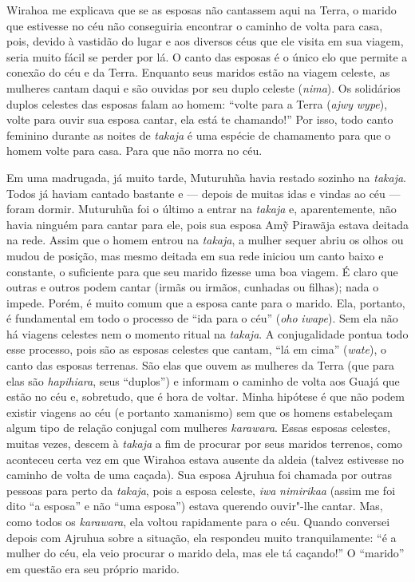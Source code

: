 Wirahoa me explicava que se as esposas não cantassem aqui na Terra, o
marido que estivesse no céu não conseguiria encontrar o caminho de volta
para casa, pois, devido à vastidão do lugar e aos diversos céus que ele
visita em sua viagem, seria muito fácil se perder por lá. O canto das
esposas é o único elo que permite a conexão do céu e da Terra. Enquanto
seus maridos estão na viagem celeste, as mulheres cantam daqui e são
ouvidas por seu duplo celeste (\emph{nima}). Os solidários duplos
celestes das esposas falam ao homem: ``volte para a Terra (\emph{ajwy}
\emph{wype}), volte para ouvir sua esposa cantar, ela está te chamando!''
Por isso, todo canto feminino durante as noites de \emph{takaja} é uma
espécie de chamamento para que o homem volte para casa. Para que não
morra no céu.

Em uma madrugada, já muito tarde, Muturuhũa havia restado sozinho na
\emph{takaja}. Todos já haviam cantado bastante e --- depois de muitas
idas e vindas ao céu --- foram dormir. Muturuhũa foi o último a entrar na
\emph{takaja} e, aparentemente, não havia ninguém para cantar para ele,
pois sua esposa Amỹ Pirawãja estava deitada na rede. Assim que o homem
entrou na \emph{takaja}, a mulher sequer abriu os olhos ou mudou de
posição, mas mesmo deitada em sua rede iniciou um canto baixo e
constante, o suficiente para que seu marido fizesse uma boa viagem. É
claro que outras e outros podem cantar (irmãs ou irmãos, cunhadas ou
filhas); nada o impede. Porém, é muito comum que a esposa cante para o
marido. Ela, portanto, é fundamental em todo o processo de ``ida para o
céu'' (\emph{oho} \emph{iwape}). Sem ela não há viagens celestes nem o
momento ritual na \emph{takaja}. A conjugalidade pontua todo esse
processo, pois são as esposas celestes que cantam, ``lá em cima''
(\emph{wate}), o canto das esposas terrenas. São elas que ouvem as
mulheres da Terra (que para elas são \emph{hapihiara}, seus ``duplos'') e
informam o caminho de volta aos Guajá que estão no céu e, sobretudo, que
é hora de voltar. Minha hipótese é que não podem existir viagens ao céu
(e portanto xamanismo) sem que os homens estabeleçam algum tipo de
relação conjugal com mulheres \emph{karawara}. Essas esposas celestes,
muitas vezes, descem à \emph{takaja} a fim de procurar por seus maridos
terrenos, como aconteceu certa vez em que Wirahoa estava ausente da
aldeia (talvez estivesse no caminho de volta de uma caçada). Sua esposa
Ajruhua foi chamada por outras pessoas para perto da \emph{takaja}, pois
a esposa celeste, \emph{iwa} \emph{nimirikaa} (assim me foi dito ``a
esposa'' e não ``uma esposa'') estava querendo ouvir"-lhe cantar. Mas, como
todos os \emph{karawara}, ela voltou rapidamente para o céu. Quando
conversei depois com Ajruhua sobre a situação, ela respondeu muito
tranquilamente: ``é a mulher do céu, ela veio procurar o marido dela, mas
ele tá caçando!'' O ``marido'' em questão era seu próprio marido.

